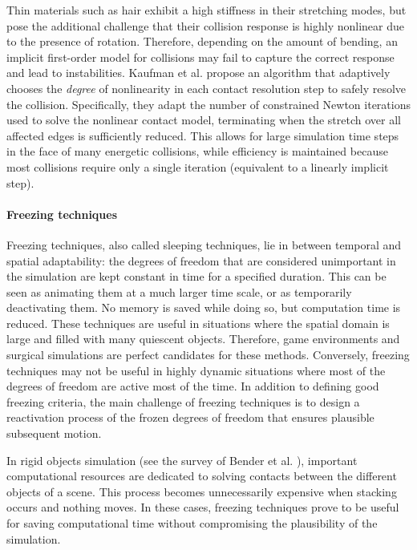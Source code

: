 Thin materials such as hair exhibit a high stiffness in their stretching modes, but pose the additional challenge that their collision response is highly nonlinear due to the presence of rotation.
Therefore, depending on the amount of bending, an implicit first-order model for collisions may fail to capture the correct response and lead to instabilities.
Kaufman et al. \cite{Kaufman2014} propose an algorithm that adaptively chooses the \emph{degree} of nonlinearity in each contact resolution step to safely resolve the collision.
Specifically, they adapt the number of constrained Newton iterations used to solve the nonlinear contact model, terminating when the stretch over all affected edges is sufficiently reduced.
This allows for large simulation time steps in the face of many energetic collisions, while efficiency is maintained because most collisions require only a single iteration (equivalent to a linearly implicit step).

\paragraph*{Freezing techniques}

Freezing techniques, also called sleeping techniques, lie in between temporal and spatial adaptability: the degrees of freedom that are considered unimportant in the simulation are kept constant in time for a specified duration.
This can be seen as animating them at a much larger time scale, or as temporarily deactivating them.
No memory is saved while doing so, but computation time is reduced.
These techniques are useful in situations where the spatial domain is large and filled with many quiescent objects.
Therefore, game environments and surgical simulations are perfect candidates for these methods.
Conversely, freezing techniques may not be useful in highly dynamic situations where most of the degrees of freedom are active most of the time.
In addition to defining good freezing criteria, the main challenge of freezing techniques is to design a reactivation process of the frozen degrees of freedom that ensures plausible subsequent motion.

In rigid objects simulation (see the survey of Bender et al. \cite{Bender2012b}), important computational resources are dedicated to solving contacts between the different objects of a scene.
This process becomes unnecessarily expensive when stacking occurs and nothing moves.
In these cases, freezing techniques prove to be useful for saving computational time without compromising the plausibility of the simulation.

